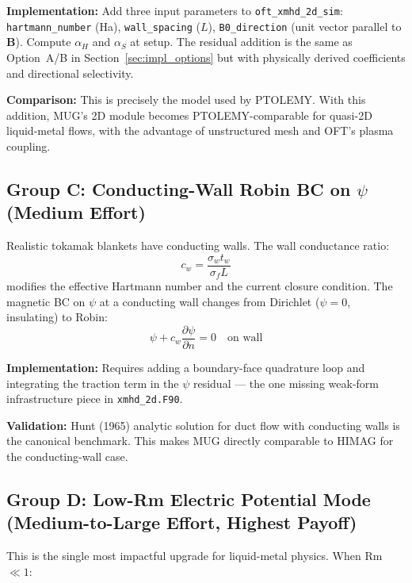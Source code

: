 \documentclass[11pt,letterpaper]{article}
\begin{document}
\textbf{Implementation:} Add three input parameters to \texttt{oft\_xmhd\_2d\_sim}:
\texttt{hartmann\_number} (Ha), \texttt{wall\_spacing} ($L$),
\texttt{B0\_direction} (unit vector parallel to $\mathbf{B}$).  Compute
$\alpha_H$ and $\alpha_S$ at setup.  The residual addition is the same as
Option~A/B in Section~\ref{sec:impl_options} but with physically derived
coefficients and directional selectivity.

\textbf{Comparison:} This is precisely the model used by PTOLEMY.  With this
addition, MUG's 2D module becomes PTOLEMY-comparable for quasi-2D liquid-metal
flows, with the advantage of unstructured mesh and OFT's plasma coupling.

\subsection{Group C: Conducting-Wall Robin BC on $\psi$ (Medium Effort)}

Realistic tokamak blankets have conducting walls.  The wall conductance ratio:
\begin{equation}
  c_w = \frac{\sigma_w t_w}{\sigma_f L}
\end{equation}
modifies the effective Hartmann number and the current closure condition.
The magnetic BC on $\psi$ at a conducting wall changes from Dirichlet
($\psi = 0$, insulating) to Robin:
\begin{equation}
  \psi + c_w \frac{\partial\psi}{\partial n} = 0 \quad \text{on wall}
  \label{eq:robin_psi}
\end{equation}

\textbf{Implementation:} Requires adding a boundary-face quadrature loop and
integrating the traction term in the $\psi$ residual --- the one missing
weak-form infrastructure piece in \texttt{xmhd\_2d.F90}.

\textbf{Validation:} Hunt (1965) analytic solution for duct flow with
conducting walls is the canonical benchmark.  This makes MUG directly
comparable to HIMAG for the conducting-wall case.

\subsection{Group D: Low-Rm Electric Potential Mode (Medium-to-Large Effort, Highest Payoff)}
\label{sec:low_rm}

This is the single most impactful upgrade for liquid-metal physics.
When Rm $\ll 1$:
\end{document}
